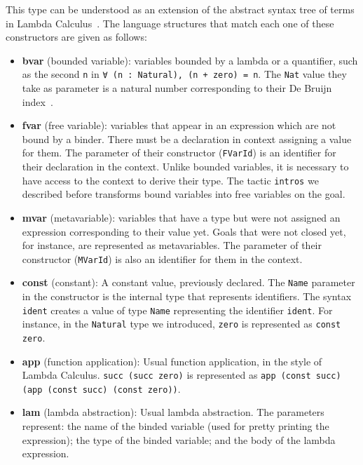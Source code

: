 This type can be understood as an extension of the abstract syntax tree of terms in Lambda Calculus~\cite{lcIntro}. The language structures that match each one of these constructors are given as follows:
\begin{itemize}
  \item \textbf{bvar} (bounded variable): variables bounded by a lambda or a quantifier, such as the second \texttt{n} in \texttt{∀ (n : Natural), (n + zero) = n}. The \texttt{Nat} value they take as parameter is a natural number corresponding to their De Bruijn index~\cite{debruijnIndices}.
  \item \textbf{fvar} (free variable): variables that appear in an expression which are not bound by a binder. There must be a declaration in context assigning a value for them.  The parameter of their constructor (\texttt{FVarId}) is an identifier for their declaration in the context. Unlike bounded variables, it is necessary to have access to the context to derive their type. The tactic \texttt{intros} we described before transforms bound variables into free variables on the goal.
  \item \textbf{mvar} (metavariable): variables that have a type but were not assigned an expression corresponding to their value yet. Goals that were not closed yet, for instance, are represented as metavariables. The parameter of their constructor (\texttt{MVarId}) is also an identifier for them in the context.
  \item \textbf{const} (constant): A constant value, previously declared. The \texttt{Name} parameter in the constructor is the internal type that represents identifiers. The syntax \texttt{\textasciigrave ident} creates a value of type \texttt{Name} representing the identifier \texttt{ident}. For instance, in the \texttt{Natural} type we introduced, \texttt{zero} is represented as \texttt{const \textasciigrave zero}.
  \item \textbf{app} (function application): Usual function application, in the style of Lambda Calculus. \texttt{succ (succ zero)} is represented as \texttt{app (const \textasciigrave succ) (app (const \textasciigrave succ) (const \textasciigrave zero))}.
  \item \textbf{lam} (lambda abstraction): Usual lambda abstraction. The parameters represent: the name of the binded variable (used for pretty printing the expression); the type of the binded variable; and the body of the lambda expression.

\end{itemize}
